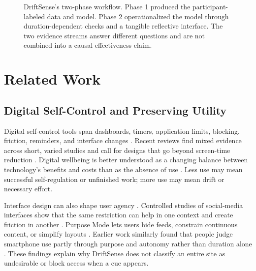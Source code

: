 \documentclass[12pt,a4paper]{article}
\newcommand{\citep}[1]{\parencite{#1}}
\begin{document}
\begin{figure}[htbp]
{
}
\caption{DriftSense's two-phase workflow. Phase 1 produced the participant-labeled data and model. Phase 2 operationalized the model through duration-dependent checks and a tangible reflective interface. The two evidence streams answer different questions and are not combined into a causal effectiveness claim.}
\label{fig:overview}
\end{figure}

\section{Related Work}

\subsection{Digital Self-Control and Preserving Utility}

Digital self-control tools span dashboards, timers, application limits, blocking, friction, reminders, and interface changes \citep{lyngs2019selfcontrol,roffarello2023digital}. Recent reviews find mixed evidence across short, varied studies and call for designs that go beyond screen-time reduction \citep{biedermann2021digital,plackett2023socialmedia,almoallim2022functionalities,almansoori2023designing}. Digital wellbeing is better understood as a changing balance between technology's benefits and costs than as the absence of use \citep{vandenabeele2020dynamic}. Less use may mean successful self-regulation or unfinished work; more use may mean drift or necessary effort.

Interface design can also shape user agency \citep{monge2023acdp,cecchinato2019agenda}. Controlled studies of social-media interfaces show that the same restriction can help in one context and create friction in another \citep{lyngs2020facebook}. Purpose Mode lets users hide feeds, constrain continuous content, or simplify layouts \citep{lee2025purpose}. Earlier work similarly found that people judge smartphone use partly through purpose and autonomy rather than duration alone \citep{lukoff2018meaningful}. These findings explain why DriftSense does not classify an entire site as undesirable or block access when a cue appears.
\end{document}
